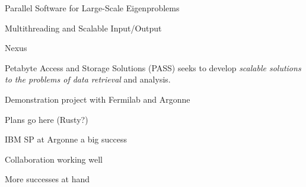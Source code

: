 \begin{small}
\begin{mainpts}
\item Parallel Software for Large-Scale Eigenproblems


\item Multithreading and Scalable
Input/Output

\item Nexus

\end{mainpts}
\end{small}
\ve

\begin{small}
\begin{mainpts}
\item Petabyte Access and Storage
Solutions (PASS) seeks to develop {\em scalable
solutions to the problems of data retrieval} and analysis.
\item Demonstration project with Fermilab and Argonne
\end{mainpts}

\end{small}
\ve

Plans go here (Rusty?)
\ve

\begin{small}
\begin{mainpts}
  \item IBM SP at Argonne a big success
  \item Collaboration working well
  \item More successes at hand
\end{mainpts}
\end{small}
\ve
